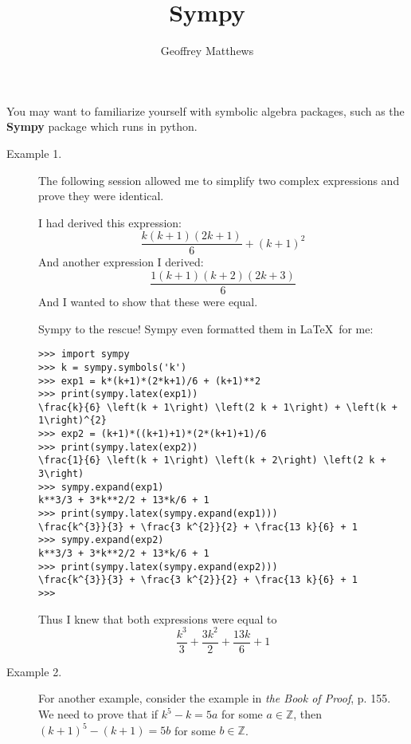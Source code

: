 \documentclass{article}
\title{Sympy}
\author{Geoffrey Matthews}
\begin{document}
\maketitle
  You may want to familiarize yourself with symbolic algebra packages,
  such as the {\bf Sympy} package which runs in python.

  \begin{description}
    \item[Example 1.] The following
  session allowed me to simplify two complex expressions
  and prove they were identical.

  I had derived this expression:
  \[
  \frac{k \left(k + 1\right) \left(2 k + 1\right)}{6} + \left(k + 1\right)^{2}
  \]
  And another expression I derived:
  \[
\frac{1 \left(k + 1\right) \left(k + 2\right) \left(2 k + 3\right)}{6}
\]
And I wanted to show that these were equal.

Sympy to the rescue!  
  Sympy even formatted them in \LaTeX\ for me:
  \begin{Verbatim}[frame=single]
>>> import sympy
>>> k = sympy.symbols('k')
>>> exp1 = k*(k+1)*(2*k+1)/6 + (k+1)**2
>>> print(sympy.latex(exp1))
\frac{k}{6} \left(k + 1\right) \left(2 k + 1\right) + \left(k + 1\right)^{2}
>>> exp2 = (k+1)*((k+1)+1)*(2*(k+1)+1)/6
>>> print(sympy.latex(exp2))
\frac{1}{6} \left(k + 1\right) \left(k + 2\right) \left(2 k + 3\right)
>>> sympy.expand(exp1)
k**3/3 + 3*k**2/2 + 13*k/6 + 1
>>> print(sympy.latex(sympy.expand(exp1)))
\frac{k^{3}}{3} + \frac{3 k^{2}}{2} + \frac{13 k}{6} + 1
>>> sympy.expand(exp2)
k**3/3 + 3*k**2/2 + 13*k/6 + 1
>>> print(sympy.latex(sympy.expand(exp2)))
\frac{k^{3}}{3} + \frac{3 k^{2}}{2} + \frac{13 k}{6} + 1
>>> 
 \end{Verbatim}
  Thus I knew that both expressions were equal to
  \[
  \frac{k^{3}}{3} + \frac{3 k^{2}}{2} + \frac{13 k}{6} + 1
  \]

\item[Example 2.]
  For another example,
consider the example in {\em the Book of Proof}, p. 155. We need
to prove that if $k^5 - k = 5a$ for some $a\in\mathbb{Z}$, then
$(k+1)^5 - (k+1) = 5b$ for some $b\in\mathbb{Z}$.


\end{description}
\end{document}
